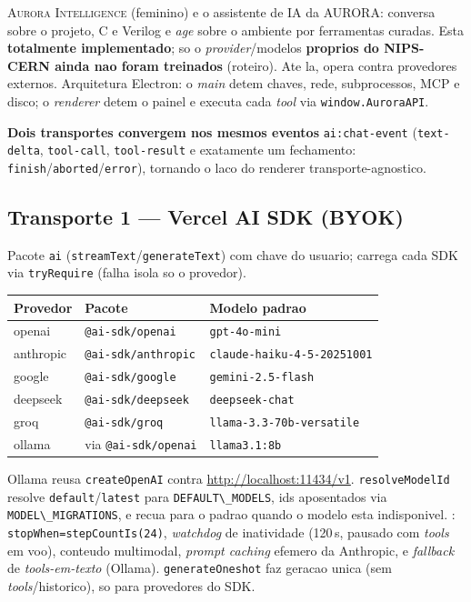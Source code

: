 \documentclass[11pt,a4paper,oneside]{article}
\newcommand{\cmm}{C\textpm{}}
\newcommand{\file}[1]{\path{#1}}
\newcommand{\tool}[1]{\textsc{#1}}
\newcommand{\code}[1]{\lstinline[basicstyle=\ttfamily]|#1|}
\begin{document}
\tool{Aurora Intelligence} (feminino) e o assistente de IA da \tool{AURORA}: conversa sobre o projeto, \cmm{} e Verilog e \emph{age} sobre o ambiente por ferramentas curadas. Esta \textbf{totalmente implementado}; so o \emph{provider}/modelos \textbf{proprios do NIPS-CERN ainda nao foram treinados} (roteiro). Ate la, opera contra provedores externos. Arquitetura Electron: o \emph{main} detem chaves, rede, subprocessos, MCP e disco; o \emph{renderer} detem o painel e executa cada \emph{tool} via \code{window.AuroraAPI}.

\textbf{Dois transportes convergem nos mesmos eventos} \code{ai:chat-event} (\code{text-delta}, \code{tool-call}, \code{tool-result} e exatamente um fechamento: \code{finish}/\code{aborted}/\code{error}), tornando o laco do renderer transporte-agnostico.

\subsection{Transporte 1 --- Vercel AI SDK (BYOK)}
Pacote \code{ai} (\code{streamText}/\code{generateText}) com chave do usuario; \file{main/ai/provider.js} carrega cada SDK via \code{tryRequire} (falha isola so o provedor).

\begin{tabularx}{\linewidth}{l l Y}
\toprule
\textbf{Provedor} & \textbf{Pacote} & \textbf{Modelo padrao} \\
\midrule
openai    & \code{@ai-sdk/openai}    & \lstinline|gpt-4o-mini| \\
anthropic & \code{@ai-sdk/anthropic} & \lstinline|claude-haiku-4-5-20251001| \\
google    & \code{@ai-sdk/google}    & \lstinline|gemini-2.5-flash| \\
deepseek  & \code{@ai-sdk/deepseek}  & \lstinline|deepseek-chat| \\
groq      & \code{@ai-sdk/groq}      & \lstinline|llama-3.3-70b-versatile| \\
ollama    & via \code{@ai-sdk/openai} & \lstinline|llama3.1:8b| \\
\bottomrule
\end{tabularx}

Ollama reusa \code{createOpenAI} contra \url{http://localhost:11434/v1}. \code{resolveModelId} resolve \lstinline|default|/\lstinline|latest| para \code{DEFAULT\_MODELS}, ids aposentados via \code{MODEL\_MIGRATIONS}, e recua para o padrao quando o modelo esta indisponivel. \file{chat.js}: \code{stopWhen=stepCountIs(24)}, \emph{watchdog} de inatividade (120\,s, pausado com \emph{tools} em voo), conteudo multimodal, \emph{prompt caching} efemero da Anthropic, e \emph{fallback} de \emph{tools-em-texto} (Ollama). \code{generateOneshot} faz geracao unica (sem \emph{tools}/historico), so para provedores do SDK.
\end{document}
